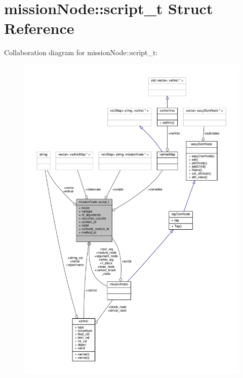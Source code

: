 \hypertarget{structmissionNode_1_1script__t}{}\section{mission\+Node\+:\+:script\+\_\+t Struct Reference}
\label{structmissionNode_1_1script__t}


Collaboration diagram for mission\+Node\+:\+:script\+\_\+t\+:
\nopagebreak
\begin{figure}[H]
\begin{center}
\leavevmode
\includegraphics[width=350pt]{d8/d5e/structmissionNode_1_1script__t__coll__graph}
\end{center}
\end{figure}
